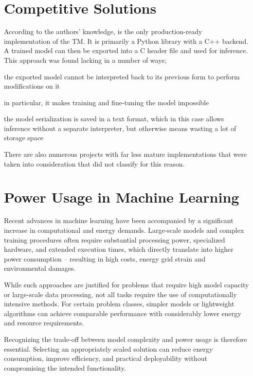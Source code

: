 \section{Competitive Solutions}
According to the authors' knowledge, \GreenTsetlinName is the only production-ready implementation of the TM. It is primarily a Python library with a C++ backend. A trained model can then be exported into a C header file and used for inference.  
This approach was found lacking in a number of ways;
\begin{compactenum}
    \item the exported model cannot be interpreted back to its previous form to perform modifications on it
    \item in particular, it makes training and fine-tuning the model impossible
    \item the model serialization is saved in a text format, which in this case allows inference without a separate interpreter, but otherwise means wasting a lot of storage space
\end{compactenum}

There are also numerous projects with far less mature implementations that were taken into consideration that did not classify for this reason. \cite{granmo2018tsetlinmachine, granmo2018tsetlinmachinec, granmo2020pytsetlinmachinecuda}

\section{Power Usage in Machine Learning}

Recent advances in machine learning have been accompanied by a significant increase in computational and energy demands. Large-scale models and complex training procedures often require substantial processing power, specialized hardware, and extended execution times, which directly translate into higher power consumption -- resulting in high costs, energy grid strain and environmental damages.

While such approaches are justified for problems that require high model capacity or large-scale data processing, not all tasks require the use of computationally intensive methods. For certain problem classes, simpler models or lightweight algorithms can achieve comparable performance with considerably lower energy and resource requirements.

Recognizing the trade-off between model complexity and power usage is therefore essential. Selecting an appropriately scaled solution can reduce energy consumption, improve efficiency, and practical deployability without compromising the intended functionality.

